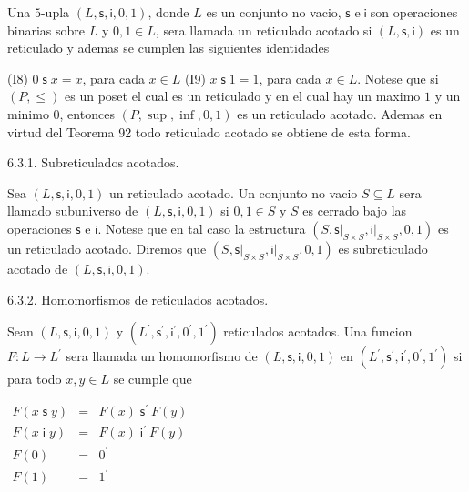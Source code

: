 Una \(5\)-upla \((L,\mathsf{s},\mathsf{i},0,1)\), donde \(L\) es un conjunto no vacio, \(\mathsf{s}\) e\(\;\mathsf{i\;}\)son operaciones binarias sobre \(L\) y \(0,1\in L\), sera llamada un reticulado acotado si \((L, \mathsf{s},\mathsf{i})\) es un reticulado y ademas se cumplen las siguientes identidades

(I8) \(0\mathsf{\;s\;}x=x\), para cada \(x\in L\)
(I9) \(x\mathsf{\;s\;}1=1\), para cada \(x\in L\).
Notese que si \((P,\leq )\) es un poset el cual es un reticulado y en el cual hay un maximo \(1\) y un minimo \(0\), entonces \((P,\sup ,\inf ,0,1)\) es un reticulado acotado. Ademas en virtud del Teorema 92 todo reticulado acotado se obtiene de esta forma.

6.3.1. Subreticulados acotados.

Sea \((L,\mathsf{s},\mathsf{i},0,1)\) un reticulado acotado. Un conjunto no vacio \(S\subseteq L\) sera llamado subuniverso de \((L,\mathsf{s}, \mathsf{i},0,1)\) si \(0,1\in S\) y \(S\) es cerrado bajo las operaciones \( \mathsf{s}\) e \(\mathsf{i}\). Notese que en tal caso la estructura \((S,\mathsf{ s}\mathrm{\mid }_{S\times S},\mathsf{i}\mathrm{\mid }_{S\times S},0,1)\) es un reticulado acotado. Diremos que \((S,\mathsf{s}\mathrm{\mid }_{S\times S}, \mathsf{i}\mathrm{\mid }_{S\times S},0,1)\) es subreticulado acotado de \((L,\mathsf{s},\mathsf{i},0,1)\).

6.3.2. Homomorfismos de reticulados acotados.

Sean \((L,\mathsf{s},\mathsf{i},0,1)\) y \((L^{\prime },\mathsf{s}^{\prime }, \mathsf{i}^{\prime },0^{\prime },1^{\prime })\) reticulados acotados. Una funcion \(F:L\rightarrow L^{\prime }\) sera llamada un homomorfismo de \((L,\mathsf{s},\mathsf{i},0,1)\) en \((L^{\prime },\mathsf{s} ^{\prime },\mathsf{i}^{\prime },0^{\prime },1^{\prime })\) si para todo \( x,y\in L\) se cumple que

\(\displaystyle \begin{array}{rcl} F(x\mathsf{\;s\;}y) & =& F(x)\;\mathsf{s}^{\prime }\ F(y) \\ F(x\mathsf{\;i\;}y) & =& F(x)\;\mathsf{i}^{\prime }\ F(y) \\ F(0) & =& 0^{\prime } \\ F(1) & =& 1^{\prime } \end{array} \)

